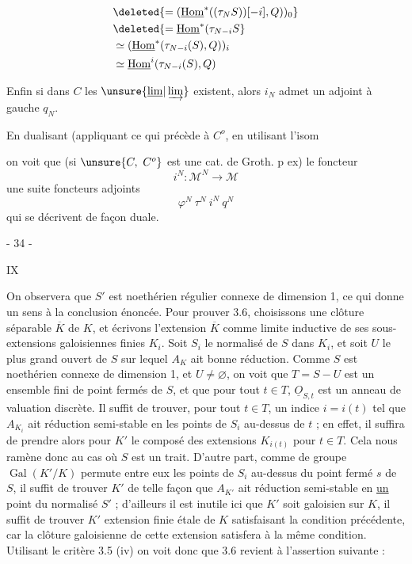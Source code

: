 \[
\begin{aligned}
&\deleted{=(\underline{\operatorname{Hom}}^*((\tau_NS))[-i],Q))_0}\\
&\deleted{=\underline{\operatorname{Hom}}^*(\tau_{N-i}S}\\
&\simeq(\underline{\operatorname{Hom}}^*(\tau_{N-i}(S),Q))_i\\
&\simeq\underline{\operatorname{Hom}}^i(\tau_{N-i}(S),Q)
\end{aligned}
\]

Enfin si dans $C$ les $\unsure{\underline{\lim}|\varinjlim}$ existent, alors $i_N$ admet un adjoint à gauche $q_N$.

En dualisant (appliquant ce qui précède à $C^o$, en utilisant l'isom


on voit que (si $\unsure{C,\ C^o}$ est une cat. de Groth. p ex) le foncteur
\[ i^N:\mathcal M^N\longrightarrow\mathcal M \]
  une suite   foncteurs adjoints
\[ \varphi^N\ \tau^N\ i^N\ q^N \]
qui se décrivent de façon duale.


\begin{center}- 34 -\end{center}\hfill IX

On observera que $S'$ est noethérien régulier connexe de dimension 1, ce qui donne un sens à la conclusion énoncée. Pour prouver 3.6, choisissons une clôture séparable $\overline K$ de $K$, et écrivons l'extension $\overline K$ comme limite inductive de ses sous-extensions galoisiennes finies $K_i$. Soit $S_i$ le normalisé de $S$ dans $K_i$, et soit $U$ le plus grand ouvert de $S$ sur lequel $A_K$ ait bonne réduction. Comme $S$ est noethérien connexe de dimension 1, et $U\ne\varnothing$, on voit que $T=S-U$ est un ensemble fini de point fermés de $S$, et que pour tout $t\in T$, $\underline O_{S,t}$ est un anneau de valuation discrète. Il suffit de trouver, pour tout $t\in T$, un indice $i=i(t)$ tel que $A_{K_i}$ ait réduction semi-stable en les points de $S_i$ au-dessus de $t$ ; en effet, il suffira de prendre alors pour $K'$ le composé des extensions $K_{i(t)}$ pour $t\in T$. Cela nous ramène donc au cas où $S$ est un trait. D'autre part, comme de groupe $\operatorname{Gal}(K'/K)$ permute entre eux les points de $S_i$ au-dessus du point fermé $s$ de $S$, il suffit de trouver $K'$ de telle façon que $A_{K'}$ ait réduction semi-stable en \uline{un} point du normalisé $S'$ ; d'ailleurs il est inutile ici que $K'$ soit galoisien sur $K$, il suffit de trouver $K'$ extension finie étale de $K$ satisfaisant la condition précédente, car la clôture galoisienne de cette extension satisfera à la même condition. Utilisant le critère 3.5 (iv) on voit donc que 3.6 revient à l'assertion suivante :

